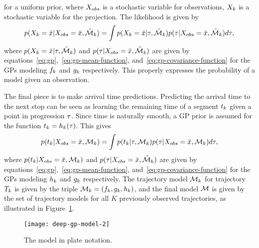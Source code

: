 for a uniform prior, where $X_{obs}$ is a stochastic variable for observations,
$X_{k}$ is a stochastic variable for the
projection. The likelihood is given by
\begin{equation}
  \label{eq:model-likelihood}
  p(X_{k} = \bar{x} \vert X_{obs} = \bar{x}, \tilde{\mathcal{M}}_{k}) =
  \int p(X_{k} = \bar{x} \vert \tau, \tilde{\mathcal{M}}_{k}) 
  p(\tau \vert X_{obs} = \bar{x}, \tilde{\mathcal{M}}_{k}) d\tau,
\end{equation}
where $p(X_{k} = \bar{x} \vert \tau,
\tilde{\mathcal{M}}_{k})$ and $p(\tau \vert X_{obs} = \bar{x},
\tilde{\mathcal{M}}_{k})$ are given by equations~\ref{eq:gp},~\ref{eq:gp-mean-function},
and~\ref{eq:gp-covariance-function} for the GPs modeling
$f_{k}$ and $g_{k}$ respectively. This properly expresses
the probability of a model given an observation.

The final piece is to make arrival time predictions. Predicting the
arrival time to the next stop can be seen as 
learning the remaining time of a segment $t_{k}$ given a point in progression $\tau$.
Since time is naturally smooth, a GP prior is assumed for the function 
$t_{k} = h_{k}(\tau)$. This gives 
\begin{equation}
  \label{eq:arrival-time-probability}
  p(t_{k} \vert X_{obs} = \bar{x}, \mathcal{M}_k) 
  = \int p(t_{k} \vert \tau,
  \mathcal{M}_{k}) p(\tau \vert X_{obs} 
  = \bar{x}, \mathcal{M}_{k}) d\tau,
\end{equation}
where $p(t_{k} \vert X_{obs} = \bar{x}, \mathcal{M}_k)$
and $p(\tau \vert X_{obs} = \bar{x},
\tilde{\mathcal{M}}_{k})$ are given by equations~\ref{eq:gp},~\ref{eq:gp-mean-function},
and~\ref{eq:gp-covariance-function} for the GPs modeling
$h_{k}$ and $g_{k}$ respectively. 
The trajectory model $\mathcal{M}_{k}$ for trajectory $T_k$ is given by the triple 
$\mathcal{M}_{k} = (f_{k}, g_{k}, h_{k})$, and
the final model $\mathcal{M}$ is given by the set of 
trajectory models for all $K$ previously observed trajectories, as
illustrated in Figure~\ref{fig:deep-gp-model}.
\begin{figure}
  \centering
  \texttt{[image: deep-gp-model-2]}
  \caption{The model in plate notation.}\label{fig:deep-gp-model}
\end{figure}

